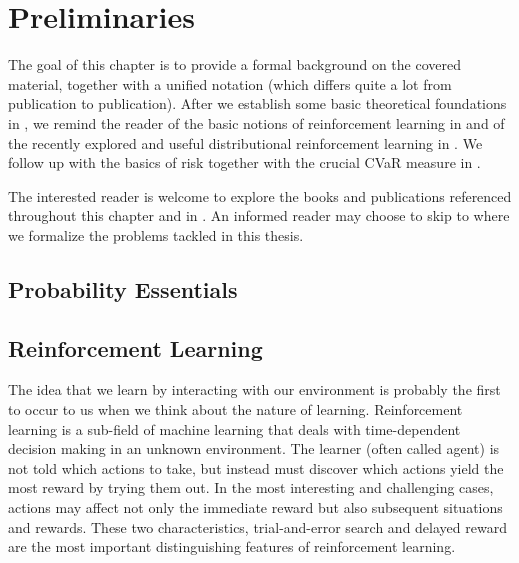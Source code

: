 \chapter{Preliminaries}\label{ch:prelim}

The goal of this chapter is to provide a formal background on the covered material, together with a unified notation (which differs quite a lot from publication to publication). After we establish some basic theoretical foundations in , we remind the reader of the basic notions of reinforcement learning in  and of the recently explored and useful distributional reinforcement learning in . We follow up with the basics of risk together with the crucial CVaR measure in .

The interested reader is welcome to explore the books and publications referenced throughout this chapter and in . An informed reader may choose to skip to  where we formalize the problems tackled in this thesis.

\section{Probability Essentials}\label{sec:prelim:essentials}





\section{Reinforcement Learning}\label{sec:prelim:rl}

The idea that we learn by interacting with our environment is probably the first to occur to us when we think about the nature of learning. Reinforcement learning \cite{sutton1998reinforcement} is a sub-field of machine learning that deals with time-dependent decision making in an unknown environment. The learner (often called agent) is not told which actions to take, but instead must discover which actions yield the most reward by trying them out. In the most interesting and challenging cases, actions may affect not only the immediate reward but also subsequent situations and rewards. These two characteristics, trial-and-error search and delayed reward are the most important distinguishing features of reinforcement learning.

